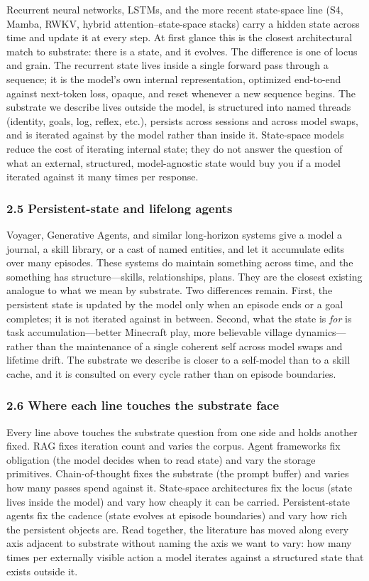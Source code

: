 \documentclass[11pt,letterpaper]{article}
\begin{document}
Recurrent neural networks, LSTMs, and the more recent state-space line (S4, Mamba, RWKV, hybrid attention–state-space stacks) carry a hidden state across time and update it at every step. At first glance this is the closest architectural match to substrate: there is a state, and it evolves. The difference is one of locus and grain. The recurrent state lives inside a single forward pass through a sequence; it is the model's own internal representation, optimized end-to-end against next-token loss, opaque, and reset whenever a new sequence begins. The substrate we describe lives outside the model, is structured into named threads (identity, goals, log, reflex, etc.), persists across sessions and across model swaps, and is iterated against by the model rather than inside it. State-space models reduce the cost of iterating internal state; they do not answer the question of what an external, structured, model-agnostic state would buy you if a model iterated against it many times per response.

\subsubsection*{2.5 Persistent-state and lifelong agents}

Voyager, Generative Agents, and similar long-horizon systems give a model a journal, a skill library, or a cast of named entities, and let it accumulate edits over many episodes. These systems do maintain something across time, and the something has structure---skills, relationships, plans. They are the closest existing analogue to what we mean by substrate. Two differences remain. First, the persistent state is updated by the model only when an episode ends or a goal completes; it is not iterated against in between. Second, what the state is \emph{for} is task accumulation---better Minecraft play, more believable village dynamics---rather than the maintenance of a single coherent self across model swaps and lifetime drift. The substrate we describe is closer to a self-model than to a skill cache, and it is consulted on every cycle rather than on episode boundaries.

\subsubsection*{2.6 Where each line touches the substrate face}

Every line above touches the substrate question from one side and holds another fixed. RAG fixes iteration count and varies the corpus. Agent frameworks fix obligation (the model decides when to read state) and vary the storage primitives. Chain-of-thought fixes the substrate (the prompt buffer) and varies how many passes spend against it. State-space architectures fix the locus (state lives inside the model) and vary how cheaply it can be carried. Persistent-state agents fix the cadence (state evolves at episode boundaries) and vary how rich the persistent objects are. Read together, the literature has moved along every axis adjacent to substrate without naming the axis we want to vary: how many times per externally visible action a model iterates against a structured state that exists outside it.
\end{document}
